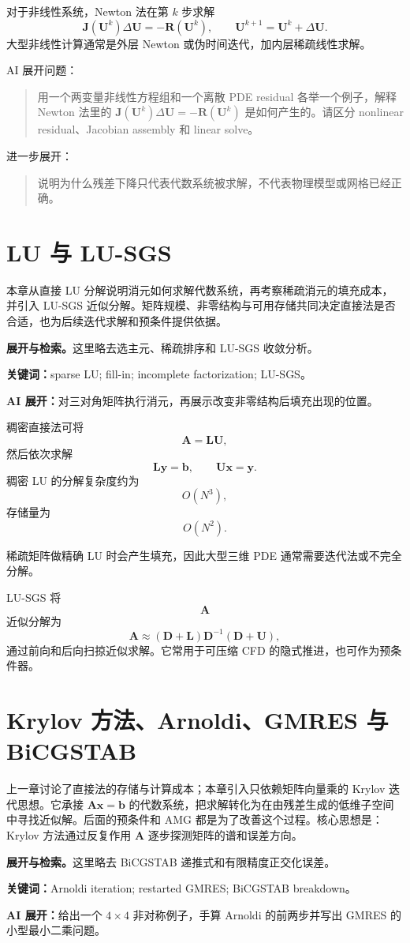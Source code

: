 \documentclass[11pt,openany]{ctexbook}
\newcommand{\studyroute}[3]{%
  \par\smallskip\noindent\textbf{展开与检索。}#1\par
  \noindent\textbf{关键词：}#2。\par
  \noindent\textbf{AI 展开：}#3\par
}
\begin{document}
对于非线性系统，Newton 法在第 \(k\) 步求解
\[
\bm J(\bm U^k)\Delta\bm U
=
-\bm R(\bm U^k),
\qquad
\bm U^{k+1}=\bm U^k+\Delta\bm U.
\]
大型非线性计算通常是外层 Newton 或伪时间迭代，加内层稀疏线性求解。

\begin{askai}
AI 展开问题：
\begin{quote}
用一个两变量非线性方程组和一个离散 PDE residual 各举一个例子，解释 Newton 法里的 \(\bm J(\bm U^k)\Delta\bm U=-\bm R(\bm U^k)\) 是如何产生的。请区分 nonlinear residual、Jacobian assembly 和 linear solve。
\end{quote}

进一步展开：
\begin{quote}
说明为什么残差下降只代表代数系统被求解，不代表物理模型或网格已经正确。
\end{quote}
\end{askai}

\chapter{LU 与 LU-SGS}

\begin{chaptersummary}
本章从直接 LU 分解说明消元如何求解代数系统，再考察稀疏消元的填充成本，并引入 LU-SGS 近似分解。矩阵规模、非零结构与可用存储共同决定直接法是否合适，也为后续迭代求解和预条件提供依据。
\end{chaptersummary}
\studyroute{这里略去选主元、稀疏排序和 LU-SGS 收敛分析。}{sparse LU; fill-in; incomplete factorization; LU-SGS}{对三对角矩阵执行消元，再展示改变非零结构后填充出现的位置。}

稠密直接法可将
\[
\bm A=\bm L\bm U,
\]
然后依次求解
\[
\bm L\bm y=\bm b,
\qquad
\bm U\bm x=\bm y.
\]
稠密 LU 的分解复杂度约为
\[
O(N^3),
\]
存储量为
\[
O(N^2).
\]

稀疏矩阵做精确 LU 时会产生填充，因此大型三维 PDE 通常需要迭代法或不完全分解。

LU-SGS 将
\[
\bm A
\]
近似分解为
\[
\bm A
\approx
(\bm D+\bm L)\bm D^{-1}(\bm D+\bm U),
\]
通过前向和后向扫掠近似求解。它常用于可压缩 CFD 的隐式推进，也可作为预条件器。

\chapter{Krylov 方法、Arnoldi、GMRES 与 BiCGSTAB}

\begin{chaptersummary}
上一章讨论了直接法的存储与计算成本；本章引入只依赖矩阵向量乘的 Krylov 迭代思想。它承接 \(\bm A\bm x=\bm b\) 的代数系统，把求解转化为在由残差生成的低维子空间中寻找近似解。后面的预条件和 AMG 都是为了改善这个过程。核心思想是：Krylov 方法通过反复作用 \(\bm A\) 逐步探测矩阵的谱和误差方向。
\end{chaptersummary}
\studyroute{这里略去 BiCGSTAB 递推式和有限精度正交化误差。}{Arnoldi iteration; restarted GMRES; BiCGSTAB breakdown}{给出一个 $4\times4$ 非对称例子，手算 Arnoldi 的前两步并写出 GMRES 的小型最小二乘问题。}
\end{document}
